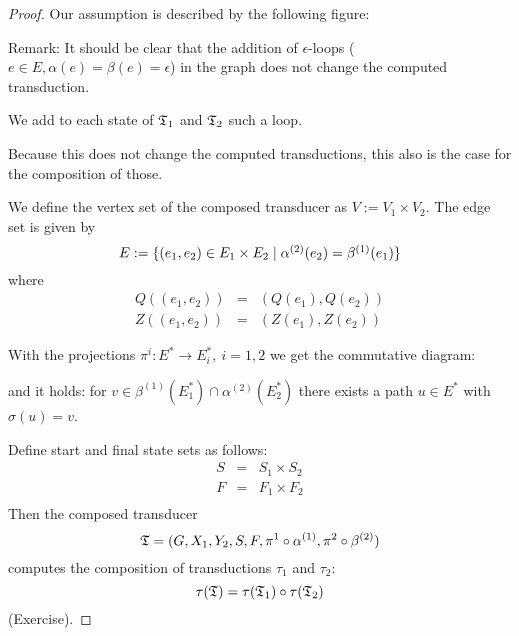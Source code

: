 \begin{proof}
Our assumption is described by the following figure:

\begin{center}
\end{center}

Remark: It should be clear that the addition of $\epsilon$-loops ($e \in E,
\alpha(e) = \beta(e) = \epsilon$) in the graph does not change the computed
transduction.

We add to each state of $\mbox{$\mathfrak{T}$}_1$ and $\mbox{$\mathfrak{T}$}_2$ such a loop.

Because this does not change the computed transductions, this also is the case
for the composition of those.

We define the vertex set of the composed transducer as $V := V_1 \times V_2$.
The edge set is given by
\[ E := \mbox{$\{(e_1, e_2) \in E_1 \times E_2 \mid \alpha^{(2)}(e_2) =
\beta^{(1)}(e_1)\}$} \]
where
\begin{eqnarray*}
Q((e_1, e_2)) & = & (Q(e_1), Q(e_2)) \\
Z((e_1, e_2)) & = & (Z(e_1), Z(e_2)) 
\end{eqnarray*}

With the projections $\pi^i : E^* \to E_i^*,\ i = 1,2$ we get the commutative
diagram:

\begin{center}
\end{center}

and it holds: for $v \in \beta^{(1)}(E_1^*) \cap \alpha^{(2)}(E_2^*)$ there
exists a path $u \in E^*$ with $\sigma(u) = v$.

Define start and final state sets as follows:
\begin{eqnarray*}
S & = & S_1 \times S_2 \\
F & = & F_1 \times F_2 \\
\end{eqnarray*}
Then the composed transducer
\[\mbox{$\mathfrak{T}$} = (G, X_1, Y_2, S, F, \pi^1 \circ \alpha^{(1)}, \pi^2 \circ
\beta^{(2)})\]
computes the composition of transductions $\tau_1$ and $\tau_2$:
\[ \tau(\mbox{$\mathfrak{T}$}) = \tau(\mbox{$\mathfrak{T}$}_1) \circ \tau(\mbox{$\mathfrak{T}$}_2) \]
(Exercise).
\end{proof}

